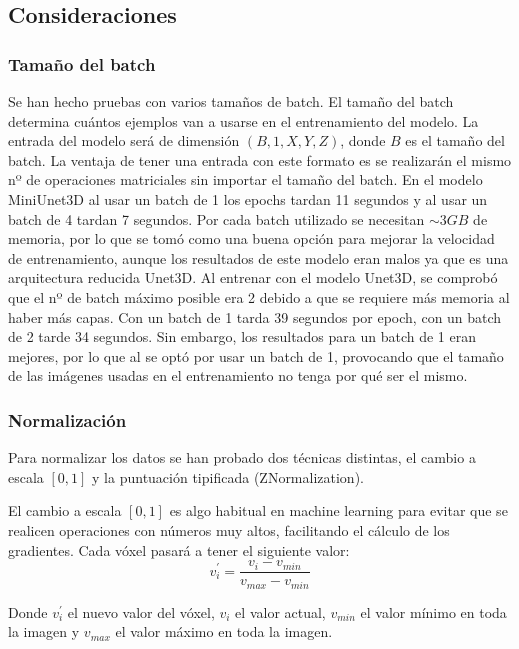 \subsection{Consideraciones}

\subsubsection{Tamaño del batch}

Se han hecho pruebas con varios tamaños de batch. El tamaño del batch determina cuántos ejemplos van a usarse en el entrenamiento del modelo. La entrada del modelo será de dimensión $(B,1,X,Y,Z)$, donde $B$ es el tamaño del batch. La ventaja de tener una entrada con este formato es se realizarán el mismo nº de operaciones matriciales sin importar el tamaño del batch. 
En el modelo MiniUnet3D al usar un batch de 1 los epochs tardan 11 segundos y al usar un batch de 4 tardan 7 segundos. Por cada batch utilizado se necesitan $\sim 3GB$ de memoria, por lo que se tomó como una buena opción para mejorar la velocidad de entrenamiento, aunque los resultados de este modelo eran malos ya que es una arquitectura reducida Unet3D.
Al entrenar con el modelo Unet3D, se comprobó que el nº de batch máximo posible era 2 debido a que se requiere más memoria al haber más capas. Con un batch de 1 tarda 39 segundos por epoch, con un batch de 2 tarde 34 segundos. Sin embargo, los resultados para un batch de 1 eran mejores, por lo que al se optó por usar un batch de 1, provocando que el tamaño de las imágenes usadas en el entrenamiento no tenga por qué ser el mismo.

\subsubsection{Normalización}

Para normalizar los datos se han probado dos técnicas distintas, el cambio a escala $[0,1]$ y la puntuación tipificada (ZNormalization).

El cambio a escala $[0,1]$ es algo habitual en machine learning para evitar que se realicen operaciones con números muy altos, facilitando el cálculo de los gradientes. Cada vóxel pasará a tener el siguiente valor:
\begin{equation}
v_i^{'} = \frac{v_i - v_{min}}{v_{max}-v_{min}}
\end{equation}

Donde $v_i^{'}$ el nuevo valor del vóxel, $v_i$ el valor actual, $v_{min}$ el valor mínimo en toda la imagen y $v_{max}$ el valor máximo en toda la imagen.

